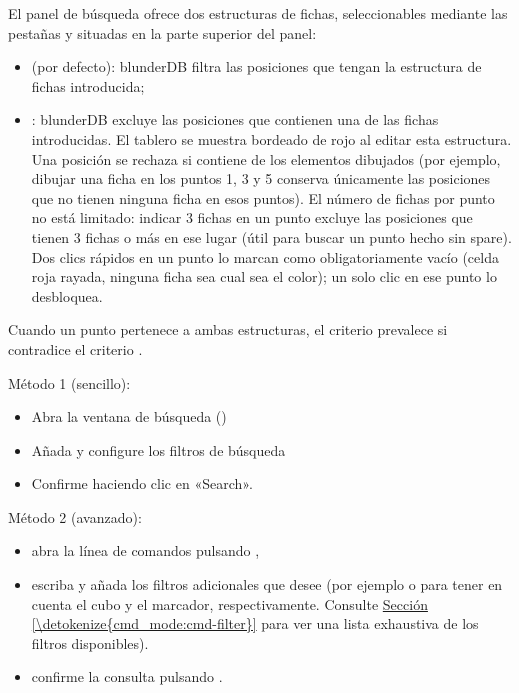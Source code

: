 \documentclass[letterpaper,10pt,spanish]{sphinxmanual}
\begin{document}
\sphinxAtStartPar
El panel de búsqueda ofrece dos estructuras de fichas, seleccionables mediante las pestañas  y  situadas en la parte superior del panel:
\begin{itemize}
\item {} 
\sphinxAtStartPar
{} (por defecto): blunderDB filtra las posiciones que tengan  la estructura de fichas introducida;

\item {} 
\sphinxAtStartPar
{}: blunderDB excluye las posiciones que contienen una de las fichas introducidas. El tablero se muestra bordeado de rojo al editar esta estructura. Una posición se rechaza si contiene  de los elementos dibujados (por ejemplo, dibujar una ficha en los puntos 1, 3 y 5 conserva únicamente las posiciones que no tienen ninguna ficha en esos puntos). El número de fichas por punto no está limitado: indicar 3 fichas en un punto excluye las posiciones que tienen 3 fichas o más en ese lugar (útil para buscar un punto hecho sin spare). Dos clics rápidos en un punto lo marcan como obligatoriamente vacío (celda roja rayada, ninguna ficha sea cual sea el color); un solo clic en ese punto lo desbloquea.

\end{itemize}

\sphinxAtStartPar
Cuando un punto pertenece a ambas estructuras, el criterio  prevalece si contradice el criterio .

\sphinxAtStartPar
Método 1 (sencillo):
\begin{itemize}
\item {} 
\sphinxAtStartPar
Abra la ventana de búsqueda ()

\item {} 
\sphinxAtStartPar
Añada y configure los filtros de búsqueda

\item {} 
\sphinxAtStartPar
Confirme haciendo clic en «Search».

\end{itemize}

\sphinxAtStartPar
Método 2 (avanzado):
\begin{itemize}
\item {} 
\sphinxAtStartPar
abra la línea de comandos pulsando ,

\item {} 
\sphinxAtStartPar
escriba  y añada los filtros adicionales que desee (por ejemplo  o  para tener en cuenta el cubo y el marcador, respectivamente. Consulte \hyperref[\detokenize{cmd_mode:cmd-filter}]{Sección \ref{\detokenize{cmd_mode:cmd-filter}}} para ver una lista exhaustiva de los filtros disponibles).

\item {} 
\sphinxAtStartPar
confirme la consulta pulsando .

\end{itemize}
\end{document}

